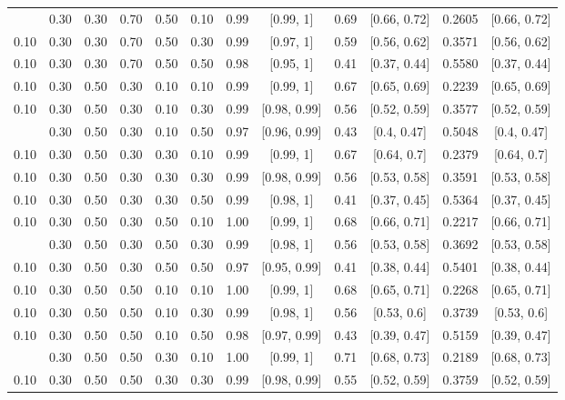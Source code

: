 \documentclass[
  11pt,
]{article}
\begin{document}
\begin{landscape}
\begin{ThreePartTable}
\begin{longtable}[t]{cccccccccccc}
\addlinespace
0.10 & 0.30 & 0.30 & 0.70 & 0.50 & 0.10 & 0.99 & {}[0.99, 1] & 0.69 & {}[0.66, 0.72] & 0.2605 & {}[0.66, 0.72]\\
0.10 & 0.30 & 0.30 & 0.70 & 0.50 & 0.30 & 0.99 & {}[0.97, 1] & 0.59 & {}[0.56, 0.62] & 0.3571 & {}[0.56, 0.62]\\
0.10 & 0.30 & 0.30 & 0.70 & 0.50 & 0.50 & 0.98 & {}[0.95, 1] & 0.41 & {}[0.37, 0.44] & 0.5580 & {}[0.37, 0.44]\\
0.10 & 0.30 & 0.50 & 0.30 & 0.10 & 0.10 & 0.99 & {}[0.99, 1] & 0.67 & {}[0.65, 0.69] & 0.2239 & {}[0.65, 0.69]\\
0.10 & 0.30 & 0.50 & 0.30 & 0.10 & 0.30 & 0.99 & {}[0.98, 0.99] & 0.56 & {}[0.52, 0.59] & 0.3577 & {}[0.52, 0.59]\\
\addlinespace
0.10 & 0.30 & 0.50 & 0.30 & 0.10 & 0.50 & 0.97 & {}[0.96, 0.99] & 0.43 & {}[0.4, 0.47] & 0.5048 & {}[0.4, 0.47]\\
0.10 & 0.30 & 0.50 & 0.30 & 0.30 & 0.10 & 0.99 & {}[0.99, 1] & 0.67 & {}[0.64, 0.7] & 0.2379 & {}[0.64, 0.7]\\
0.10 & 0.30 & 0.50 & 0.30 & 0.30 & 0.30 & 0.99 & {}[0.98, 0.99] & 0.56 & {}[0.53, 0.58] & 0.3591 & {}[0.53, 0.58]\\
0.10 & 0.30 & 0.50 & 0.30 & 0.30 & 0.50 & 0.99 & {}[0.98, 1] & 0.41 & {}[0.37, 0.45] & 0.5364 & {}[0.37, 0.45]\\
0.10 & 0.30 & 0.50 & 0.30 & 0.50 & 0.10 & 1.00 & {}[0.99, 1] & 0.68 & {}[0.66, 0.71] & 0.2217 & {}[0.66, 0.71]\\
\addlinespace
0.10 & 0.30 & 0.50 & 0.30 & 0.50 & 0.30 & 0.99 & {}[0.98, 1] & 0.56 & {}[0.53, 0.58] & 0.3692 & {}[0.53, 0.58]\\
0.10 & 0.30 & 0.50 & 0.30 & 0.50 & 0.50 & 0.97 & {}[0.95, 0.99] & 0.41 & {}[0.38, 0.44] & 0.5401 & {}[0.38, 0.44]\\
0.10 & 0.30 & 0.50 & 0.50 & 0.10 & 0.10 & 1.00 & {}[0.99, 1] & 0.68 & {}[0.65, 0.71] & 0.2268 & {}[0.65, 0.71]\\
0.10 & 0.30 & 0.50 & 0.50 & 0.10 & 0.30 & 0.99 & {}[0.98, 1] & 0.56 & {}[0.53, 0.6] & 0.3739 & {}[0.53, 0.6]\\
0.10 & 0.30 & 0.50 & 0.50 & 0.10 & 0.50 & 0.98 & {}[0.97, 0.99] & 0.43 & {}[0.39, 0.47] & 0.5159 & {}[0.39, 0.47]\\
\addlinespace
0.10 & 0.30 & 0.50 & 0.50 & 0.30 & 0.10 & 1.00 & {}[0.99, 1] & 0.71 & {}[0.68, 0.73] & 0.2189 & {}[0.68, 0.73]\\
0.10 & 0.30 & 0.50 & 0.50 & 0.30 & 0.30 & 0.99 & {}[0.98, 0.99] & 0.55 & {}[0.52, 0.59] & 0.3759 & {}[0.52, 0.59]\\

\end{longtable}
\end{ThreePartTable}
\end{landscape}
\end{document}
